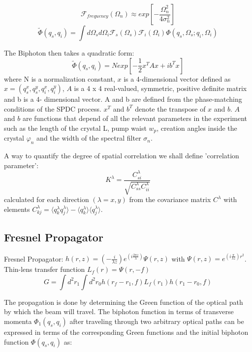 \begin{equation}
\mathcal{F}_{frequency}(\Omega_n) \approx exp \left[-\frac{ \Omega^2_n}{4 \sigma^2_n} \right] 
\end{equation}
\begin{equation}
\tilde{\Phi}(q_s,q_i)=\int d\Omega_s d\Omega_i \mathcal{F}_s (\Omega_s) \mathcal{F}_i (\Omega_i) \Phi(q_s,\Omega_s;q_i,\Omega_i)
\end{equation}

The Biphoton then takes a quadratic form:
\begin{equation}\label{eq:quadratic}
\tilde{\Phi}(q_s,q_i)=N exp\left[ -\frac{1}{2}x^T A x + i b^T x \right]
\end{equation}
where N is a normalization constant, $x$ is a 4-dimensional vector defined as $x = (q^x_s, q^y_s ,q^x_i,q^y_i )$, $A$ is a 4 x 4 real-valued, symmetric, positive definite matrix and b is a 4- dimensional vector. A and b are defined from the phase-matching conditions of the SPDC process. $x^T$ and $b^T$ denote the transpose of $x$ and $b$. $A$ and $b$ are functions that depend of all the relevant parameters in the experiment such as the length of the crystal L, pump waist $w_p$, creation angles inside the crystal $\varphi_n$ and the width of the spectral filter $\sigma_n$.

A way to quantify the degree of spatial correlation we shall define 'correlation parameter':
\begin{equation}
K^\lambda = \frac{C^\lambda_{si}}{\sqrt{C^\lambda_{ss}C^\lambda_{ii}}}
\end{equation}
calculated for each direction $(\lambda = x, y)$ from the covariance matrix $C^\lambda$ with elements $C^\lambda_{kj} = \langle q^\lambda_k q^\lambda_j \rangle - \langle q^\lambda_k \rangle \langle q^\lambda_j \rangle $.


\subsection{Fresnel Propagator}
Fresnel Propagator: $h(r,z)=(- \frac{i}{\lambda z})e^{(i \frac{2 \pi z}{\lambda})} \Psi (r,z)$ 
with $\Psi(r,z) = e^{(i \frac{\pi}{\lambda z })r^2}$. Thin-lens transfer function $L_f (r)=\Psi(r,-f)$
 \\
\begin{equation}\label{eq:green}
G= \int d^2 r_1 \int d^2 r_0 h(r_f - r_1,f) L_f(r_1) h(r_1 - r_0,f)
\end{equation}

The propagation is done by determining the Green function of the optical path
by which the beam will travel. The biphoton function
in terms of transverse momenta $\Phi_1 (q_s , q_i )$ after traveling
through two arbitrary optical paths can be expressed
in terms of the corresponding Green functions and the
initial biphoton function $\Phi(q_s , q_i )$ as:

